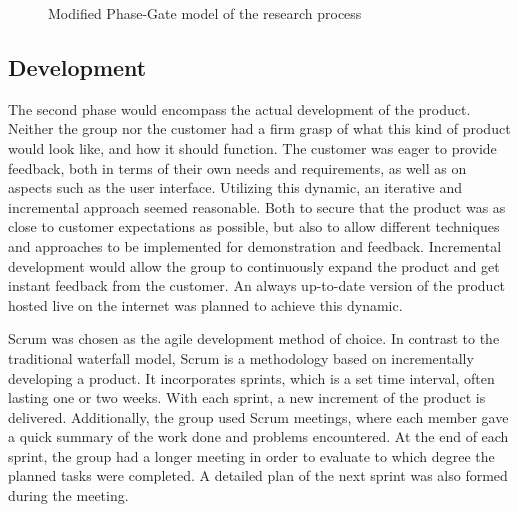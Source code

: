 \begin{center}
  \begin{figure}[ht!]
    \caption{Modified Phase-Gate model of the research process}
    \label{fig:phasegate}
  \end{figure}
\end{center}

\subsection{Development}
\label{subsec:process_and_methodology-process_methodology-development}

The second phase would encompass the actual development of the product. Neither the group nor the customer had a firm grasp of what this kind of product would look like, and how it should function. The customer was eager to provide feedback, both in terms of their own needs and requirements, as well as on aspects such as the user interface. Utilizing this dynamic, an iterative and incremental approach seemed reasonable. Both to secure that the product was as close to customer expectations as possible, but also to allow different techniques and approaches to be implemented for demonstration and feedback. Incremental development would allow the group to continuously expand the product and get instant feedback from the customer. An always up-to-date version of the product hosted live on the internet was planned to achieve this dynamic.

Scrum \cite{scrum} was chosen as the agile development method of choice. In contrast to the traditional waterfall model, Scrum is a methodology based on incrementally developing a product. It incorporates sprints, which is a set time interval, often lasting one or two weeks. With each sprint, a new increment of the product is delivered. Additionally, the group used Scrum meetings, where each member gave a quick summary of the work done and problems encountered. At the end of each sprint, the group had a longer meeting in order to evaluate to which degree the planned tasks were completed. A detailed plan of the next sprint was also formed during the meeting.

